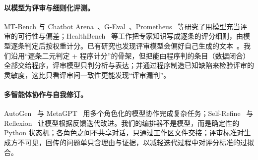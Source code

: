 \paragraph{以模型为评审与细则化评测。}MT-Bench 与 Chatbot Arena~\citep{zheng2023judging}、G-Eval~\citep{liu2023geval}、Prometheus~\citep{kim2024prometheus} 等研究了用模型充当评审的可行性与偏差；HealthBench~\citep{arora2025healthbench} 等工作把专家知识写成逐条的评分细则，由模型逐条判定后按权重计分。已有研究也发现评审模型会偏好自己生成的文本~\citep{panickssery2024self}。我们沿用“逐条二元判定 + 程序计分”的骨架，但把能由程序判的条目（数据闭合）全部交给程序，评审模型只判分析与表达；并通过程序制造已知缺陷来检验评审的灵敏度，这比只看评审间一致性更能发现“评审漏判”。

\paragraph{多智能体协作与自我修订。}AutoGen~\citep{wu2023autogen} 与 MetaGPT~\citep{hong2024metagpt} 用多个角色化的模型协作完成复杂任务；Self-Refine~\citep{madaan2023selfrefine} 与 Reflexion~\citep{shinn2023reflexion} 让模型根据反馈迭代改进。我们的编排器不是模型，而是确定性的 Python 状态机；各角色之间不共享对话，只通过工作区文件交接；评审标准对生成方不可见，回传的问题单只含理由与证据，以减轻迭代过程中对评分标准的过拟合。
